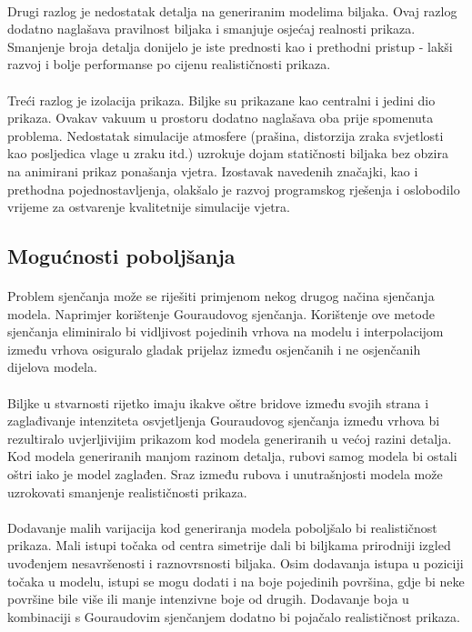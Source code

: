 \documentclass[times, utf8, diplomski]{fer}
\begin{document}
\paragraph{}
Drugi razlog je nedostatak detalja na generiranim modelima biljaka. Ovaj razlog 
dodatno naglašava pravilnost biljaka i smanjuje osjećaj realnosti prikaza.
Smanjenje broja detalja donijelo je iste prednosti kao i prethodni pristup - 
lakši razvoj i bolje performanse po cijenu realističnosti prikaza.
\paragraph{}
Treći razlog je izolacija prikaza. Biljke su prikazane kao centralni i jedini 
dio prikaza. Ovakav vakuum u prostoru dodatno naglašava oba prije spomenuta 
problema. Nedostatak simulacije atmosfere (prašina, distorzija zraka svjetlosti 
kao posljedica vlage u zraku itd.) uzrokuje dojam statičnosti biljaka bez
obzira na animirani prikaz ponašanja vjetra. Izostavak navedenih značajki, kao
i prethodna pojednostavljenja, olakšalo je razvoj programskog rješenja i 
oslobodilo vrijeme za ostvarenje kvalitetnije simulacije vjetra.

\subsection{Mogućnosti poboljšanja}
\paragraph{}
Problem sjenčanja može se riješiti primjenom nekog drugog načina sjenčanja 
modela. Naprimjer korištenje Gouraudovog sjenčanja. Korištenje ove metode 
sjenčanja eliminiralo bi vidljivost pojedinih vrhova na modelu i interpolacijom
između vrhova osiguralo gladak prijelaz između osjenčanih i ne osjenčanih 
dijelova modela. 
\paragraph{}
Biljke u stvarnosti rijetko imaju ikakve oštre bridove između svojih strana i 
zaglađivanje intenziteta osvjetljenja Gouraudovog sjenčanja između vrhova bi 
rezultiralo uvjerljivijim prikazom kod modela generiranih u većoj razini 
detalja. Kod modela generiranih manjom razinom detalja, rubovi samog modela bi
ostali oštri iako je model zaglađen. Sraz između rubova i unutrašnjosti modela
može uzrokovati smanjenje realističnosti prikaza.
\paragraph{}
Dodavanje malih varijacija kod generiranja modela poboljšalo bi realističnost 
prikaza. Mali istupi točaka od centra simetrije dali bi biljkama prirodniji
izgled uvođenjem nesavršenosti i raznovrsnosti biljaka. Osim dodavanja istupa
u poziciji točaka u modelu, istupi se mogu dodati i na boje pojedinih površina,
gdje bi neke površine bile više ili manje intenzivne boje od drugih. Dodavanje
boja u kombinaciji s Gouraudovim sjenčanjem dodatno bi pojačalo realističnost
prikaza.
\end{document}
